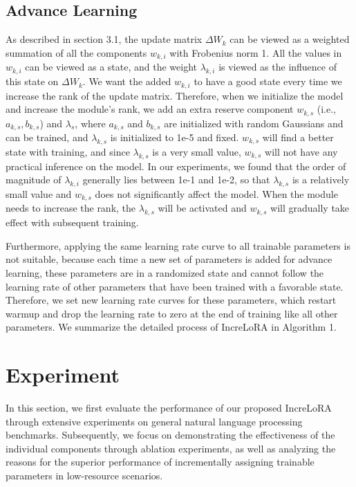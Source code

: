 \subsection{Advance Learning} As described in section 3.1, the update matrix $\Delta W_k$ can be viewed as a weighted summation of all the components $w_{k,i}$ with Frobenius norm 1. All the values in $w_{k,i}$ can be viewed as a state, and the weight $\lambda_{k,i}$ is viewed as the influence of this state on $\Delta W_k$. We want the added $w_{k,i}$ to have a good state every time we increase the rank of the update matrix. Therefore, when we initialize the model and increase the module's rank, we add an extra reserve component $w_{k,s}$ (i.e., $a_{k,s}, b_{k,s}$) and $\lambda_s$, where $a_{k,s}$ and $b_{k,s}$ are initialized with random Gaussians and can be trained, and $\lambda_{k,s}$ is initialized to 1e-5 and fixed. $w_{k,s}$ will find a better state with training, and since $\lambda_{k,s}$ is a very small value, $w_{k,s}$ will not have any practical inference on the model. In our experiments, we found that the order of magnitude of $\lambda_{k,i}$ generally lies between 1e-1 and 1e-2, so that $\lambda_{k,s}$ is a relatively small value and $w_{k,s}$ does not significantly affect the model. When the module needs to increase the rank, the $\lambda_{k,s}$ will be activated and $w_{k,s}$ will gradually take effect with subsequent training.

Furthermore, applying the same learning rate curve to all trainable parameters is not suitable, because each time a new set of parameters is added for advance learning, these parameters are in a randomized state and cannot follow the learning rate of other parameters that have been trained with a favorable state. Therefore, we set new learning rate curves for these parameters, which restart warmup and drop the learning rate to zero at the end of training like all other parameters. We summarize the detailed process of IncreLoRA in Algorithm 1.

\section{Experiment}
In this section, we first evaluate the performance of our proposed IncreLoRA through extensive experiments on general natural language processing benchmarks. Subsequently, we focus on demonstrating the effectiveness of the individual components through ablation experiments, as well as analyzing the reasons for the superior performance of incrementally assigning trainable parameters in low-resource scenarios.

